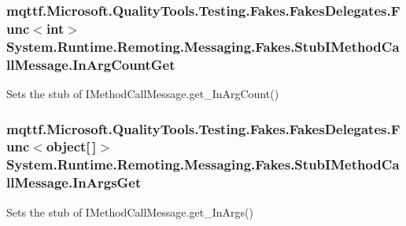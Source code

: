 \hypertarget{class_system_1_1_runtime_1_1_remoting_1_1_messaging_1_1_fakes_1_1_stub_i_method_call_message_a603a9a486ba7d12a5df56ba1e8dcf4a6}{
\subsubsection[{In\-Arg\-Count\-Get}]{\setlength{\rightskip}{0pt plus 5cm}mqttf.\-Microsoft.\-Quality\-Tools.\-Testing.\-Fakes.\-Fakes\-Delegates.\-Func$<$int$>$ System.\-Runtime.\-Remoting.\-Messaging.\-Fakes.\-Stub\-I\-Method\-Call\-Message.\-In\-Arg\-Count\-Get}}\label{class_system_1_1_runtime_1_1_remoting_1_1_messaging_1_1_fakes_1_1_stub_i_method_call_message_a603a9a486ba7d12a5df56ba1e8dcf4a6}


Sets the stub of I\-Method\-Call\-Message.\-get\-\_\-\-In\-Arg\-Count()

\hypertarget{class_system_1_1_runtime_1_1_remoting_1_1_messaging_1_1_fakes_1_1_stub_i_method_call_message_a0ee1acea9f2a89242ca424d588c57f06}{
\subsubsection[{In\-Args\-Get}]{\setlength{\rightskip}{0pt plus 5cm}mqttf.\-Microsoft.\-Quality\-Tools.\-Testing.\-Fakes.\-Fakes\-Delegates.\-Func$<$object\mbox{[}$\,$\mbox{]}$>$ System.\-Runtime.\-Remoting.\-Messaging.\-Fakes.\-Stub\-I\-Method\-Call\-Message.\-In\-Args\-Get}}\label{class_system_1_1_runtime_1_1_remoting_1_1_messaging_1_1_fakes_1_1_stub_i_method_call_message_a0ee1acea9f2a89242ca424d588c57f06}


Sets the stub of I\-Method\-Call\-Message.\-get\-\_\-\-In\-Args()

